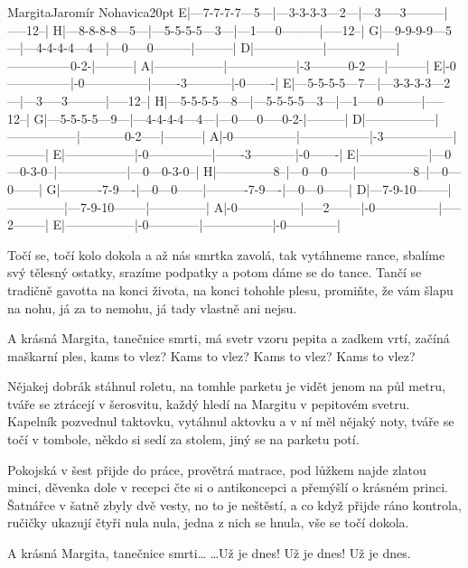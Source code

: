 \begin{song}{Margita}{Jaromír Nohavica}{20pt}
\tabs{20pt}
E|---7-7-7-7---5---|---3-3-3-3---2---|---3-----3---------|-----12--|
H|---8-8-8-8---5---|---5-5-5-5---3---|---1-----0---------|-----12--|
G|---9-9-9-9---5---|---4-4-4-4---4---|---0-----0---------|---------|
D|-----------------|-----------------|---------------0-2-|---------|
A|-----------------|-----------------|-3---------0-2-----|---------|
E|-0---------------|-0---------------|-------3-----------|-0-------|
\endtabs
\tabs{20pt}
E|---5-5-5-5---7---|---3-3-3-3---2---|---3-----3---------|-----12--|
H|---5-5-5-5---8---|---5-5-5-5---3---|---1-----0---------|-----12--|
G|---5-5-5-5---9---|---4-4-4-4---4---|---0-----0-----0-2-|---------|
D|-----------------|-----------------|-----------0-2-----|---------|
A|-0---------------|-----------------|-3-----------------|---------|
E|-----------------|-0---------------|-------3-----------|-0-------|
\endtabs
\tabs{20pt}
E|-----------------|---0---0-3-0--|-----------------|---0---0-3-0--|
H|--------------8--|---0---0------|--------------8--|---0---0------|
G|----------7-9----|---0---0------|----------7-9----|---0---0------|
D|---7-9-10--------|--------------|---7-9-10--------|--------------|
A|-0---------------|-----2--------|-0---------------|-----2--------|
E|-----------------|-0------------|-----------------|-0------------|
\endtabs

%
Točí se, točí kolo dokola a až nás smrtka zavolá, tak vytáhneme rance,
sbalíme svý tělesný ostatky, srazíme podpatky a potom dáme se do tance.
Tančí se tradičně gavotta na konci života, na konci tohohle plesu,
promiňte, že vám šlapu na nohu, já za to nemohu, já tady vlastně ani nejsu.

\chorus%
A krásná Margita, tanečnice smrti,
má svetr vzoru pepita a zadkem vrtí,
začíná maškarní ples, kams to vlez?
Kams to vlez? Kams to vlez? Kams to vlez?

%
Nějakej dobrák stáhnul roletu, na tomhle parketu je vidět jenom na půl metru,
tváře se ztrácejí v šerosvitu, každý hledí na Margitu v pepitovém svetru.
Kapelník pozvednul taktovku, vytáhnul aktovku a v ní měl nějaký noty,
tváře se točí v tombole, někdo si sedí za stolem, jiný se na parketu potí.
\repchor

%
Pokojská v šest přijde do práce, provětrá matrace, pod lůžkem najde zlatou minci,
děvenka dole v recepci čte si o antikoncepci a přemýšlí o krásném princi.
Šatnářce v šatně zbyly dvě vesty, no to je neštěstí, a co když přijde ráno kontrola,
ručičky ukazují čtyři nula nula, jedna z nich se hnula, vše se točí dokola.

\chorus%
A krásná Margita, tanečnice smrti\dots
\dots Už je dnes! Už je dnes! Už je dnes.
\end{song}
